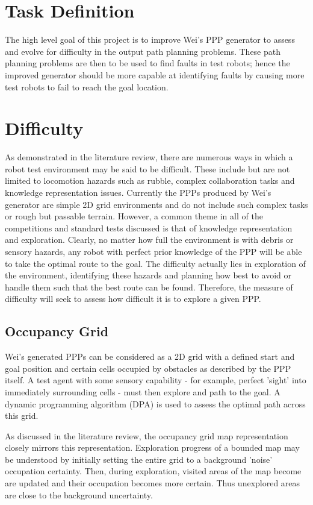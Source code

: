 \documentclass[authoryearcitations]{UoYCSproject}
\begin{document}
\section{Task Definition}
\label{sec:pa2}
The high level goal of this project is to improve Wei's PPP generator to assess and evolve for difficulty in the output path planning problems. These path planning problems are then to be used to find faults in test robots; hence the improved generator should be more capable at identifying faults by causing more test robots to fail to reach the goal location.

\section{Difficulty}
\label{sec:pa3}
As demonstrated in the literature review, there are numerous ways in which a robot test environment may be said to be difficult. These include but are not limited to locomotion hazards such as rubble, complex collaboration tasks and knowledge representation issues. Currently the PPPs produced by Wei's generator are simple 2D grid environments and do not include such complex tasks or rough but passable terrain. However, a common theme in all of the competitions and standard tests discussed is that of knowledge representation and exploration. Clearly, no matter how full the environment is with debris or sensory hazards, any robot with perfect prior knowledge of the PPP will be able to take the optimal route to the goal. The difficulty actually lies in exploration of the environment, identifying these hazards and planning how best to avoid or handle them such that the best route can be found. Therefore, the measure of difficulty will seek to assess how difficult it is to explore a given PPP.

\subsection{Occupancy Grid}
\label{sec:pa3_occ_grid}
Wei's generated PPPs can be considered as a 2D grid with a defined start and goal position and certain cells occupied by obstacles as described by the PPP itself. A test agent with some sensory capability - for example, perfect 'sight' into immediately surrounding cells - must then explore and path to the goal. A dynamic programming algorithm (DPA) is used to assess the optimal path across this grid.

As discussed in the literature review, the occupancy grid map representation closely mirrors this representation. Exploration progress of a bounded map may be understood by initially setting the entire grid to a background 'noise' occupation certainty. Then, during exploration, visited areas of the map become are updated and their occupation becomes more certain. Thus unexplored areas are close to the background uncertainty.
\end{document}
